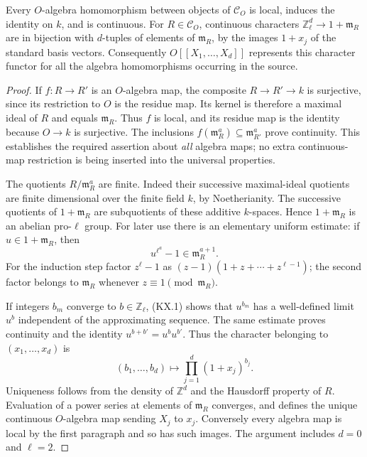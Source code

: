 \begin{lemma}
\label{claim:KX1}
Every $O$-algebra homomorphism between objects of $\mathcal C_O$
is local, induces the identity on $k$, and is continuous.
For $R\in\mathcal C_O$, continuous characters
$\mathbb Z_\ell^d\longrightarrow 1+\mathfrak m_R$
are in bijection with $d$-tuples of elements of $\mathfrak m_R$,
by the images $1+x_j$ of the standard basis vectors.
Consequently $O[[X_1,\ldots,X_d]]$ represents this character functor
for all the algebra homomorphisms occurring in the source.
\end{lemma}
\begin{proof}
If $f:R\to R'$ is an $O$-algebra map, the composite
$R\to R'\to k$ is surjective, since its restriction to $O$ is the
residue map.  Its kernel is therefore a maximal ideal of $R$ and
equals $\mathfrak m_R$.  Thus $f$ is local, and its residue map is
the identity because $O\to k$ is surjective.  The inclusions
$f(\mathfrak m_R^a)\subseteq\mathfrak m_{R'}^a$ prove continuity.
This establishes the required assertion about \emph{all} algebra
maps; no extra continuous-map restriction is being inserted into
the universal properties.

The quotients $R/\mathfrak m_R^a$ are finite.  Indeed their
successive maximal-ideal quotients are finite dimensional over the
finite field $k$, by Noetherianity.  The successive quotients of
$1+\mathfrak m_R$ are subquotients of these additive $k$-spaces.
Hence $1+\mathfrak m_R$ is an abelian pro-$\ell$ group.
For later use there is an elementary uniform estimate: if
$u\in1+\mathfrak m_R$, then
\[
             u^{\ell^a}-1\in\mathfrak m_R^{a+1}.
                                                               \tag{KX.1}
\]
For the induction step factor $z^\ell-1$ as
$(z-1)(1+z+\cdots+z^{\ell-1})$; the second factor belongs to
$\mathfrak m_R$ whenever $z\equiv1\pmod {\mathfrak m_R}$.

If integers $b_m$ converge to $b\in\mathbb Z_\ell$, (KX.1)
shows that $u^{b_m}$ has a well-defined limit $u^b$ independent
of the approximating sequence.  The same estimate proves continuity
and the identity $u^{b+b'}=u^bu^{b'}$.  Thus the character belonging
to $(x_1,\ldots,x_d)$ is
\[
          (b_1,\ldots,b_d)\longmapsto
                       \prod_{j=1}^d(1+x_j)^{b_j}.
                                                               \tag{KX.2}
\]
Uniqueness follows from the density of $\mathbb Z^d$ and the
Hausdorff property of $R$.  Evaluation of a power series at elements
of $\mathfrak m_R$ converges, and defines the unique continuous
$O$-algebra map sending $X_j$ to $x_j$.  Conversely every algebra
map is local by the first paragraph and so has such images.
The argument includes $d=0$ and $\ell=2$.
\end{proof}

